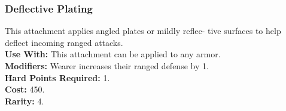 \subsubsection{Deflective Plating}
This attachment applies angled plates or mildly reflec-
tive surfaces to help deflect incoming ranged attacks.\\
\textbf{Use With:} This attachment can be applied to any armor.\\
\textbf{Modifiers:} Wearer increases their ranged defense by 1.\\
\textbf{Hard Points Required:} 1.\\
\textbf{Cost:} 450.\\
\textbf{Rarity:} 4.\\
